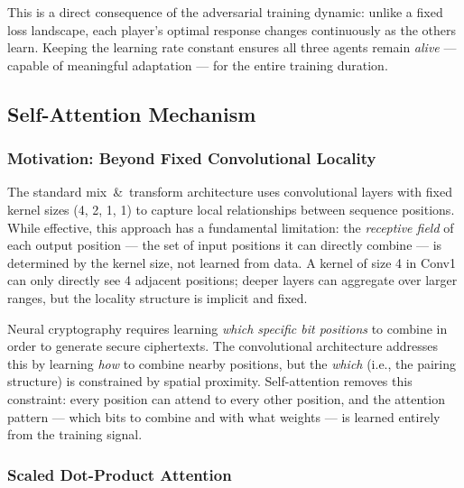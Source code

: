\documentclass[12pt, a4paper]{article}
\begin{document}
\noindent This is a direct consequence of the adversarial training
dynamic: unlike a fixed loss landscape, each player's optimal response
changes continuously as the others learn. Keeping the learning rate
constant ensures all three agents remain \emph{alive} — capable of
meaningful adaptation — for the entire training duration.

\subsection{Self-Attention Mechanism}
\label{subsec:attention}

\subsubsection*{Motivation: Beyond Fixed Convolutional Locality}

The standard mix~\&~transform architecture uses convolutional layers with
fixed kernel sizes (4, 2, 1, 1) to capture local relationships between
sequence positions. While effective, this approach has a fundamental
limitation: the \emph{receptive field} of each output position — the
set of input positions it can directly combine — is determined by the
kernel size, not learned from data. A kernel of size 4 in Conv1 can
only directly see 4 adjacent positions; deeper layers can aggregate over
larger ranges, but the locality structure is implicit and fixed.

Neural cryptography requires learning \emph{which specific bit positions}
to combine in order to generate secure ciphertexts. The convolutional
architecture addresses this by learning \emph{how} to combine nearby
positions, but the \emph{which} (i.e., the pairing structure) is
constrained by spatial proximity. Self-attention removes this constraint:
every position can attend to every other position, and the attention
pattern — which bits to combine and with what weights — is learned
entirely from the training signal.

\subsubsection*{Scaled Dot-Product Attention}
\end{document}
